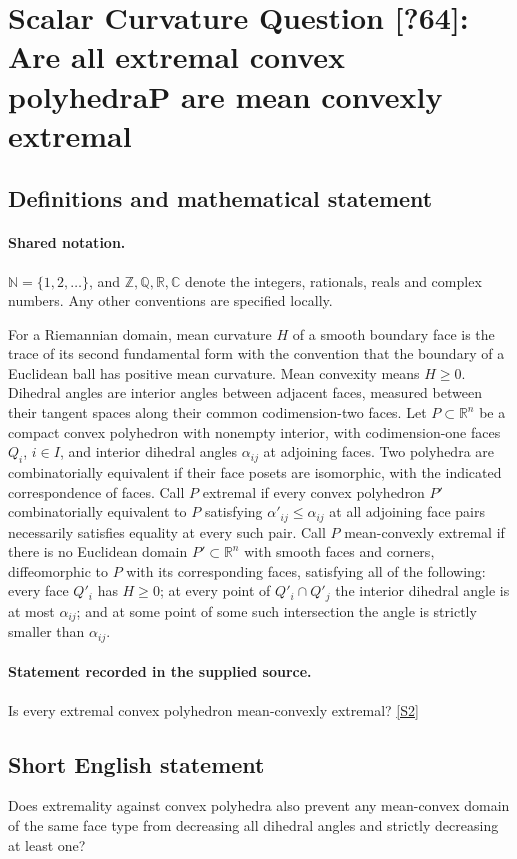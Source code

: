 \documentclass[11pt]{article}
\newcommand{\sref}[2]{\hyperlink{source:#1:#2}{[S#2]}}
\begin{document}
\section{Scalar Curvature Question [?64]: Are all extremal convex polyhedraP are mean convexly extremal}\label{statement}

\subsection{Definitions and mathematical statement}

\paragraph{Shared notation.}$\mathbb N=\{1,2,\ldots\}$, and $\mathbb Z,\mathbb Q,\mathbb R,\mathbb C$ denote the integers, rationals, reals and complex numbers. Any other conventions are specified locally.


For a Riemannian domain, mean curvature $H$ of a smooth boundary face is the trace of its second fundamental form with the convention that the boundary of a Euclidean ball has positive mean curvature. Mean convexity means $H\geq0$. Dihedral angles are interior angles between adjacent faces, measured between their tangent spaces along their common codimension-two faces.
Let $P\subset\mathbb R^n$ be a compact convex polyhedron with nonempty interior, with codimension-one faces $Q_i$, $i\in I$, and interior dihedral angles $\alpha_{ij}$ at adjoining faces. Two polyhedra are combinatorially equivalent if their face posets are isomorphic, with the indicated correspondence of faces. Call $P$ extremal if every convex polyhedron $P'$ combinatorially equivalent to $P$ satisfying $\alpha'_{ij}\leq\alpha_{ij}$ at all adjoining face pairs necessarily satisfies equality at every such pair.
Call $P$ mean-convexly extremal if there is no Euclidean domain $P'\subset\mathbb R^n$ with smooth faces and corners, diffeomorphic to $P$ with its corresponding faces, satisfying all of the following: every face $Q'_i$ has $H\geq0$; at every point of $Q'_i\cap Q'_j$ the interior dihedral angle is at most $\alpha_{ij}$; and at some point of some such intersection the angle is strictly smaller than $\alpha_{ij}$.
\paragraph{Statement recorded in the supplied source.}
Is every extremal convex polyhedron mean-convexly extremal? \sref{statement}{2}
\subsection{Short English statement}
Does extremality against convex polyhedra also prevent any mean-convex domain of the same face type from decreasing all dihedral angles and strictly decreasing at least one?
\end{document}
